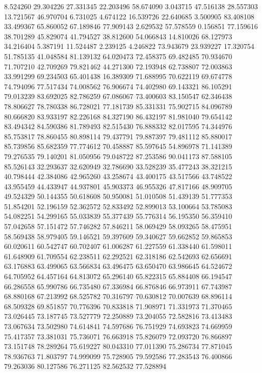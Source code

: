 8.524260
29.304226
27.331345
22.203496
58.674090
3.043715
47.516138
28.557303
13.721567
46.970704
6.731025
4.674122
16.539726
22.640685
3.500905
83.408108
33.499367
65.860052
67.189846
77.909143
2.629532
57.578559
0.156851
77.159616
38.701289
45.829074
41.794527
38.812600
54.066843
14.810026
68.127973
34.216404
5.387191
11.524487
2.239125
4.246822
73.943679
23.939227
17.320754
51.785135
41.048584
81.139132
64.020473
72.458375
69.482485
70.934670
71.707210
42.709269
79.821462
44.271300
72.193948
62.738807
72.003863
33.991299
69.234503
65.401438
16.389309
71.688995
70.622119
69.674778
74.794096
77.517434
74.008562
76.906674
74.402980
69.143321
86.105291
79.013239
83.692025
82.786259
67.086067
73.400603
83.150547
62.346438
78.806627
78.780338
86.728021
77.181739
85.331331
75.902715
84.096789
80.666820
83.933197
82.226168
84.327190
86.432197
81.981040
79.654142
83.494342
84.590386
81.789493
82.515430
76.888332
82.017595
74.344976
85.753817
78.860455
80.898114
79.437791
79.887397
79.481112
85.880017
85.739856
85.682359
77.774612
70.458887
85.597645
54.896978
71.141389
79.276535
79.140201
81.050956
79.048722
87.253586
90.041173
87.588105
85.526143
32.293637
32.620949
32.786690
33.528239
35.477243
38.321215
40.798444
42.384086
42.965260
43.258674
43.400175
43.517566
43.748522
43.955459
44.433947
44.937801
45.903373
46.955326
47.817166
48.909705
49.524329
50.144355
50.618608
50.950081
51.010508
51.439139
51.777353
51.854201
52.196159
52.362572
52.833492
52.899013
53.100664
53.785083
54.082251
54.299165
55.033839
55.377439
55.776314
56.195350
56.359410
57.042658
57.151472
57.746282
57.846211
58.069429
58.093265
58.475951
58.569438
58.979405
59.146521
59.397609
59.340627
59.662852
59.865853
60.020611
60.542747
60.702407
61.006287
61.227559
61.338440
61.598011
61.648909
61.709554
62.238511
62.292521
62.318186
62.542693
62.656691
63.176883
63.499065
63.566834
63.496475
63.650470
63.986645
64.524672
64.705952
64.457164
64.813072
65.296140
65.822315
65.884408
66.194547
66.286558
65.990786
66.735480
67.336984
66.876846
66.973911
67.743987
68.880168
67.213992
68.525782
70.316797
70.630812
70.007639
68.896114
68.509328
69.851857
70.776396
70.833818
71.908971
71.331973
71.370465
73.026445
73.187745
73.527779
72.250889
73.204055
72.582816
73.413483
73.067634
73.502980
74.614841
74.597686
76.751929
74.693823
74.669959
75.417357
73.381031
75.736071
76.663918
75.826079
72.093720
76.866897
73.151748
78.289264
75.619227
80.043310
77.011390
75.286734
77.871045
78.936763
71.803797
74.999099
75.728905
79.592586
77.283543
76.400866
79.263036
80.127586
76.271125
82.562532
77.528894
